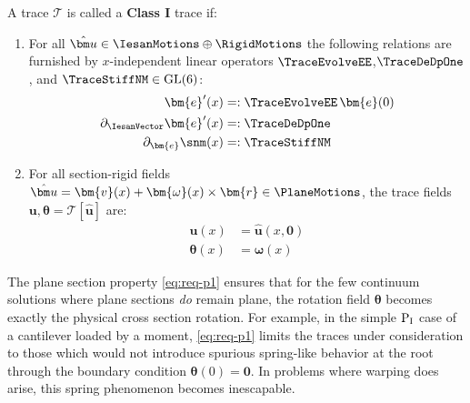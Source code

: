 \begin{definition}[Class I]\label{def:class-1} %
A trace \(\mathcal{T}\) is called a \textbf{Class I} trace if:
\begin{enumerate}[label=(\roman*)]
    \item For all \(\hat{\bm u} \in \IesanMotions\oplus \RigidMotions\) the following relations are furnished by $x$-independent linear operators \(\TraceEvolveEE\),\(\TraceDeDpOne\), and \(\TraceStiffNM\in\mathrm{GL}(6)\):
    \begin{subequations}
    \begin{align}
        \bm{e}'(x) &=: \TraceEvolveEE\,\bm{e}(0) 
        \label{eq:req-t1} 
        \\ 
        \partial_{\IesanVector}\bm{e}'(x) &=: \TraceDeDpOne 
        \label{eq:req-d1}
        \\ 
        \partial_{\bm{e}} \snm(x) &=: \TraceStiffNM 
        \label{eq:req-c1}
    \end{align}
    \label{eq:class-i-a}
    \end{subequations}

    \item For all section-rigid fields \(\hat{\bm u} =\bm{v}(x)+\bm{\omega}(x)\times\bm{r} \in \PlaneMotions\), the trace fields \(\bm{u},\bm{\theta} = \mathcal{T} [\hat{\bm u}]\) are:
    \begin{subequations}
    \begin{align}
        \bm{u}(x) &= \hat{\bm u}(x,\mathbf{0}) \\
        \bm{\theta}(x) &= \bm{\omega}(x)
    \end{align}
    \label{eq:req-p1}
    \end{subequations}
\end{enumerate}
\end{definition}
%
The plane section property \eqref{eq:req-p1} ensures that for the few continuum solutions where plane sections \emph{do} remain plane, the rotation field \(\bm{\theta}\) becomes exactly the physical cross section rotation.
For example, in the simple \(\mathrm{P}_{\rm I}\) case of a cantilever loaded by a moment, \eqref{eq:req-p1} limits the traces under consideration to those which would not introduce spurious spring-like behavior at the root through the boundary condition \(\bm{\theta}(0) = \mathbf{0}\). 
In problems where warping does arise, this spring phenomenon becomes inescapable. 



